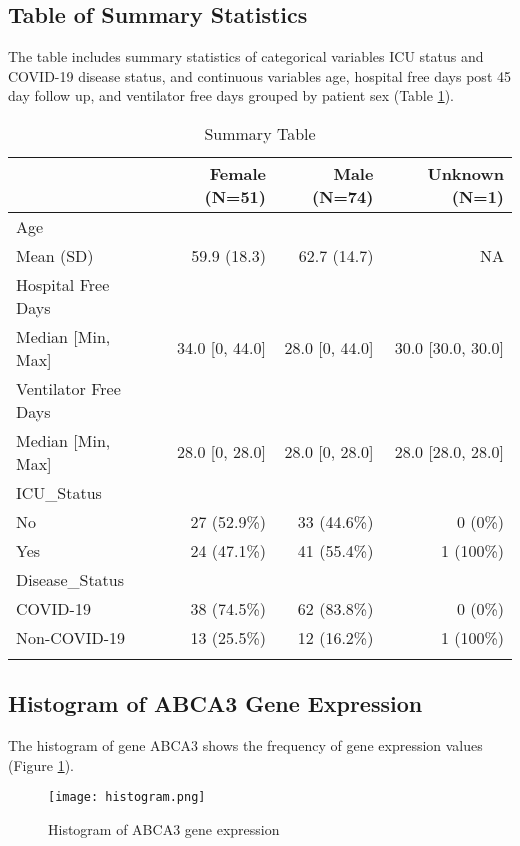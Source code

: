 \documentclass{article}
\begin{document}
\subsection{Table of Summary Statistics}
   \hspace{\parindent} The table includes summary statistics of categorical variables ICU status and COVID-19 disease status, and continuous variables age, hospital free days post 45 day follow up, and ventilator free days grouped by patient sex (Table \ref{table:table}).
\begin{table}[h]
\caption{Summary Table}
\centering
\begin{tabular}{lrrr}
\toprule
  & Female (N=51) & Male (N=74) & Unknown (N=1) \\
\midrule
Age &  &  &  \\
\hspace{1em}Mean (SD) & 59.9 (18.3) & 62.7 (14.7) & NA \\
\addlinespace
Hospital Free Days &  &  &  \\
\hspace{1em}Median [Min, Max] & 34.0 [0, 44.0] & 28.0 [0, 44.0] & 30.0 [30.0, 30.0] \\
\addlinespace
Ventilator Free Days &  &  &  \\
\hspace{1em}Median [Min, Max] & 28.0 [0, 28.0] & 28.0 [0, 28.0] & 28.0 [28.0, 28.0] \\
\addlinespace
ICU\_Status &  &  &  \\
\hspace{1em}No & 27 (52.9\%) & 33 (44.6\%) & 0 (0\%) \\
\hspace{1em}Yes & 24 (47.1\%) & 41 (55.4\%) & 1 (100\%) \\
\addlinespace
Disease\_Status &  &  &  \\
\hspace{1em}COVID-19 & 38 (74.5\%) & 62 (83.8\%) & 0 (0\%) \\
\hspace{1em}Non-COVID-19 & 13 (25.5\%) & 12 (16.2\%) & 1 (100\%) \\
\bottomrule
\label{table:table}
\end{tabular}
\end{table}

  
\subsection{Histogram of ABCA3 Gene Expression}
\hspace{\parindent}The histogram of gene ABCA3 shows the frequency of gene expression values (Figure \ref{fig:histogram}).
\begin{figure}
    \centering
    \texttt{[image: histogram.png]}
    \caption{Histogram of ABCA3 gene expression }
    \label{fig:histogram}
\end{figure}
\end{document}
